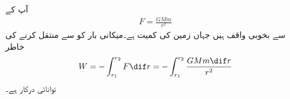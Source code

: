 
آپ  کے 
\begin{align}
F=\frac{GMm}{r^2}
\end{align}
سے بخوبی واقف ہیں جہاں  زمین کی کمیت ہے۔میکانی بار  کو  سے  منتقل کرنے کی خاطر
\begin{align}
W=-\int_{r_1}^{r_2} F \dif r=-\int_{r_1}^{r_2} \frac{GMm \dif r}{r^2}
\end{align}
توانائی درکار ہے۔
